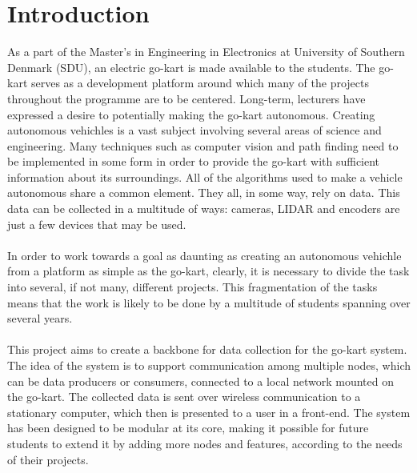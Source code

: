 \section{Introduction} %
\label{sec:introduction}
As a part of the Master's in Engineering in Electronics at University of Southern Denmark (SDU), an electric go-kart is made available to the students.
The go-kart serves as a development platform around which many of the projects throughout the programme are to be centered.
Long-term, lecturers have expressed a desire to potentially making the go-kart autonomous.
Creating autonomous vehichles is a vast subject involving several areas of science and engineering.
Many techniques such as computer vision and path finding need to be implemented in some form in order to provide the go-kart with sufficient information about its surroundings.
All of the algorithms used to make a vehicle autonomous share a common element.
They all, in some way, rely on data.
This data can be collected in a multitude of ways: cameras, LIDAR and encoders are just a few devices that may be used.\\~\\
In order to work towards a goal as daunting as creating an autonomous vehichle from a platform as simple as the go-kart, clearly, it is necessary to divide the task into several, if not many, different projects.
This fragmentation of the tasks means that the work is likely to be done by a multitude of students spanning over several years.\\~\\
This project aims to create a backbone for data collection for the go-kart system.
The idea of the system is to support communication among multiple nodes, which can be data producers or consumers, connected to a local network mounted on the go-kart.
The collected data is sent over wireless communication to a stationary computer, which then is presented to a user in a front-end.
The system has been designed to be modular at its core, making it possible for future students to extend it by adding more nodes and features, according to the needs of their projects.

